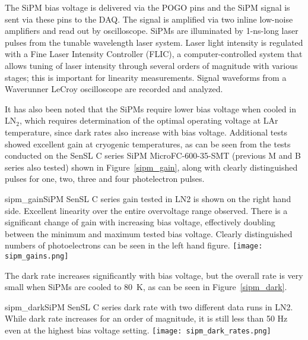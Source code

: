 The SiPM bias voltage is delivered via the POGO pins and the SiPM signal is
sent via these pins to the DAQ. The signal is amplified via two inline
low-noise amplifiers and read out by oscilloscope. SiPMs are
illuminated by 1-ns-long laser pulses from the tunable wavelength
laser system. Laser light intensity is regulated with a Fine Laser
Intensity Controller (FLIC), a computer-controlled system that allows
tuning of laser intensity through several orders of magnitude with
various stages; this is important for linearity measurements. Signal waveforms
from a Waverunner LeCroy oscilloscope are recorded and analyzed.

It has also been noted that the SiPMs require lower bias voltage when
cooled in LN$_2$, which requires determination of the optimal operating
voltage at LAr temperature, since dark rates also increase with bias
voltage. Additional tests showed excellent gain at cryogenic
temperatures, as can be seen from the tests conducted on the SenSL C
series SiPM MicroFC-600-35-SMT (previous M and B series also tested) 
shown in Figure~\ref{sipm_gain}, along with clearly distinguished pulses
for one, two, three and four photelectron pulses.

\begin{cdrfigure}{sipm_gain}{SiPM SenSL C series gain tested in LN2 is
    shown on the right hand side. Excellent linearity over the entire
    overvoltage range observed. There is a significant change of gain
    with increasing bias voltage, effectively doubling between the
    minimum and maximum tested bias voltage. Clearly distinguished
    numbers of photoelectrons can be seen in the left hand figure.}    
  \texttt{[image: sipm\_gains.png]}
\end{cdrfigure}

The dark rate increases significantly with bias voltage, but the
overall rate is very small when SiPMs are cooled to 80~K, as can
be seen in Figure~\ref{sipm_dark}.

\begin{cdrfigure}{sipm_dark}{SiPM SenSL C series dark rate with
    two different data runs in LN2. While dark rate increases for an
    order of magnitude, it is still less than 50 Hz even at the
    highest bias voltage setting.}     
  \texttt{[image: sipm\_dark\_rates.png]}
\end{cdrfigure}


